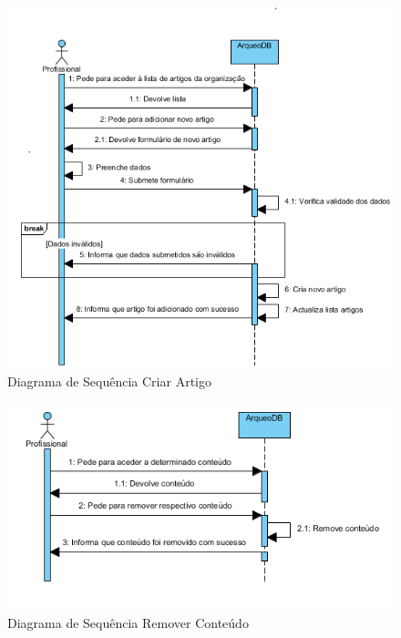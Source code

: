 \documentclass[12pt,a4paper]{article}
\begin{document}
\begin{figure}[h!]
\centering
\includegraphics[scale=0.8]{sequencia/criarartigo}
\caption{Diagrama de Sequência Criar Artigo} 
\end{figure}


\begin{figure}[h!]
\centering
\includegraphics[scale=0.8]{sequencia/removerconteudo}
\caption{Diagrama de Sequência Remover Conteúdo} 
\end{figure} 
\end{document}
